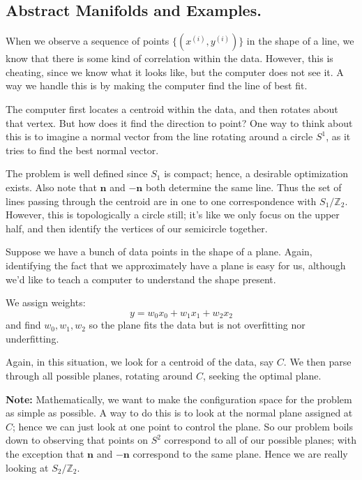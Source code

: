 \documentclass[12pt,letterpaper,boxed]{maths_v5}
\newcommand{\zz}{\mathbb{Z}}
\theoremstyle{definition}
\begin{document}
    \subsection*{Abstract Manifolds and Examples.}
    \begin{example}
        When we observe a sequence of points  $\{(x^(i), y^(i))\}$ 
        in the shape of a line, we know that 
        there is some kind of correlation within the data. However, this is cheating, since we know 
        what it looks like, but the computer does not see it. A way we handle this is by making the computer 
        find the line of best fit. 
    
        The computer first locates a centroid within the data, and then rotates 
        about that vertex. But how does it find the direction to point? One way 
        to think about this is to imagine a normal vector from the line rotating 
        around a circle $S^1$, as it tries to find the best normal vector. 
    
        The problem is well defined since $S_1$ is compact; hence, a desirable optimization exists. 
        Also note that $\bm{n}$ and $-\bm{n}$ both determine the same line. Thus the set of 
        lines passing through the centroid are in one to one correspondence with 
        $S_1/\zz_2$. However, this is topologically a circle still; it's like we only focus on
        the upper half, and then identify the vertices of our semicircle together. 
    \end{example}

    \begin{example}
        Suppose we have a bunch of data points in the shape of a plane. Again, identifying 
        the fact that we approximately have a plane is easy for us, although we'd like 
        to teach a computer to understand the shape present. 

        We assign weights: 
        \[
            y = w_0x_0 + w_1x_1 + w_2x_2  
        \]
        and find $w_0, w_1, w_2$ so the plane fits the data but is not overfitting 
        nor underfitting. 

        Again, in this situation, we look for a centroid of the data, say $C$. We then parse
        through all possible planes, rotating around $C$, seeking the optimal plane. 

        \textbf{Note:} Mathematically, we want to make the configuration space 
        for the problem as simple as possible. A way to do this is to look at the normal plane 
        assigned at $C$; hence we can just look at one point to control the plane. 
        So our problem boils down to observing that points on $S^2$ correspond to all 
        of our possible planes; with the exception that $\bm{n}$ and $-\bm{n}$ correspond 
        to the same plane. Hence we are really looking at $S_2/\zz_2$. 
    \end{example}
\end{document}

